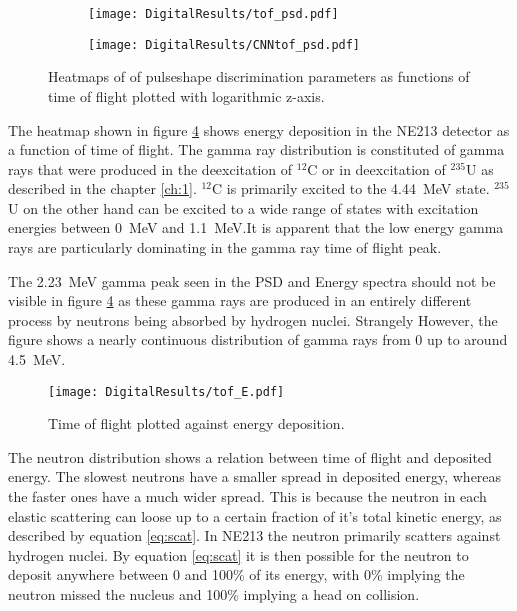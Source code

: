 \documentclass[main.tex]{subfiles}
\begin{document}
\begin{figure}
    \centering
    \begin{subfigure}[ht]{\textwidth}
        \texttt{[image: DigitalResults/tof\_psd.pdf]}
        \caption{}
        \label{fig:tof_digi_cc}
    \end{subfigure}
	\begin{subfigure}[ht]{\textwidth}
        \texttt{[image: DigitalResults/CNNtof\_psd.pdf]}
        \caption{}
        \label{fig:tof_digi_cnn}
    \end{subfigure}
    \caption[Pulse shape parameters as function of time of flight, digital setup.]{Heatmaps of of pulseshape discrimination parameters as functions of time of flight plotted with logarithmic z-axis.}
    \label{fig:tof_cc_tof_cnn}
\end{figure}

The heatmap shown in figure \ref{fig:tof_E_d} shows energy deposition in the NE213 detector as a function of time of flight. The gamma ray distribution is constituted of gamma rays that were produced in the deexcitation of $^\mathrm{12}$C or in deexcitation of $^\mathrm{235}$U as described in the chapter \ref{ch:1}. $^\mathrm{12}$C is primarily excited to the \SI{4.44}{\MeV} state. $^\mathrm{235}$U on the other hand can be excited to a wide range of states with excitation energies between \SI{0}{MeV} and \SI{1.1}{MeV}\cite{Nudat}.It is apparent that the low energy gamma rays are particularly dominating in the gamma ray time of flight peak.

The \SI{2.23}{MeV} gamma peak seen in the PSD and Energy spectra should not be visible in figure \ref{fig:tof_E_d} as these gamma rays are produced in an entirely different process by neutrons being absorbed by hydrogen nuclei. Strangely However, the figure shows a nearly continuous distribution of gamma rays from 0 up to around \SI{4.5}{MeV}.

\begin{figure}[ht]
    \centering
        \texttt{[image: DigitalResults/tof\_E.pdf]}
        \caption[Time of flight plotted against energy deposition.]{Time of flight plotted against energy deposition.}
    \label{fig:tof_E_d} 
\end{figure}

The neutron distribution shows a relation between time of flight and deposited energy. The slowest neutrons have a smaller spread in deposited energy, whereas the faster ones have a much wider spread. This is because the neutron in each elastic scattering can loose up to a certain fraction of it's total kinetic energy, as described by equation \ref{eq:scat}. In NE213 the neutron primarily scatters against hydrogen nuclei. By equation \ref{eq:scat} it is then possible for the neutron to deposit anywhere between 0 and 100\% of its energy, with 0\% implying the neutron missed the nucleus and 100\% implying a head on collision.
\end{document}
